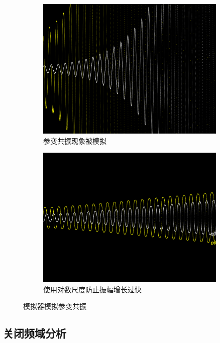 \documentclass[12pt]{article}
\begin{document}
\begin{figure}[h]
  \centering
  \begin{subfigure}[b]{0.45\linewidth}
    \includegraphics[width=\linewidth]{parametric_resonance.png}
    \caption{参变共振现象被模拟}
  \end{subfigure}
  \begin{subfigure}[b]{0.45\linewidth}
    \includegraphics[width=\linewidth]{parametric_resonance_logarithmic.png}
    \caption{使用对数尺度防止振幅增长过快}
  \end{subfigure}
  \caption{模拟器模拟参变共振}
  \label{fig:parametric}
\end{figure}

\subsection{关闭频域分析}
\end{document}
